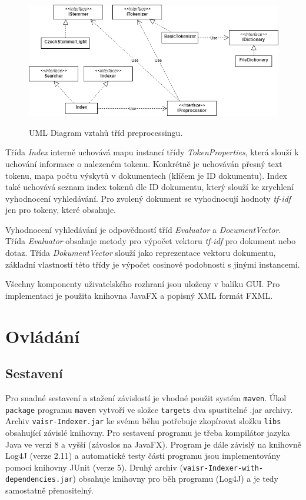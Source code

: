 \documentclass[12pt, a4paper]{article}
\begin{document}
\begin{figure}[h!]
\centering
\includegraphics[bb= 0 0 686 306 , width=140mm]{UML-preprocess.png}
\label{fig:preprocessUML}
\caption{UML Diagram vztahů tříd preprocessingu.}
\end{figure}

Třída \emph{Index} interně uchovává mapu instancí třídy \emph{TokenProperties}, která slouží k uchování informace o nalezeném tokenu. Konkrétně je uchováván přesný text tokenu, mapa počtu výskytů v dokumentech (klíčem je ID dokumentu). Index také uchovává seznam index tokenů dle ID dokumentu, který slouží ke zrychlení vyhodnocení vyhledávání. Pro zvolený dokument se vyhodnocují hodnoty \emph{tf-idf} jen pro tokeny, které obsahuje.

Vyhodnocení vyhledávání je odpovědností tříd \emph{Evaluator} a \emph{DocumentVector}. Třída \emph{Evaluator} obsahuje metody pro výpočet vektoru \emph{tf-idf} pro dokument nebo dotaz. Třída \emph{DokumentVector} slouží jako reprezentace vektoru dokumentu, základní vlastností této třídy je výpočet cosinové podobnosti s jinými instancemi.    

Všechny komponenty uživatelského rozhraní jsou uloženy v balíku GUI. Pro implementaci je použita knihovna JavaFX a popisný XML formát FXML. 

\section{Ovládání}

\subsection{Sestavení}

Pro snadné sestavení a stažení závislostí je vhodné použit systém \texttt{maven}. Úkol \texttt{package} programu \texttt{maven} vytvoří ve složce \texttt{targets} dva spustitelné .jar archivy. Archiv \texttt{vaisr-Indexer.jar} ke svému běhu potřebuje zkopírovat složku \texttt{libs} obsahující závislé knihovny. Pro sestavení programu je třeba kompilátor jazyka Java ve verzi 8 a vyšší (závoslos na JavaFX). Program je dále závislý na knihovně Log4J (verze 2.11) a automatické testy části programu jsou implementovány pomocí knihovny JUnit (verze 5). Druhý archiv (\texttt{vaisr-Indexer-with-dependencies.jar}) obsahuje knihovny pro běh programu (Log4J) a je tedy samostatně přenositelný.
\end{document}
